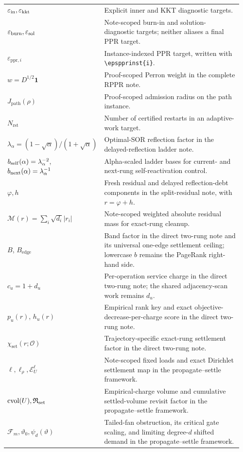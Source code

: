 \begin{longtable}{@{}>{\raggedright\arraybackslash}p{0.36\linewidth}>{\raggedright\arraybackslash}p{0.60\linewidth}@{}}
$\varepsilon_{\rm in},\varepsilon_{\rm kkt}$ & Explicit inner and KKT diagnostic targets. \\
$\varepsilon_{\rm burn},\varepsilon_{\rm sol}$ & Note-scoped burn-in and solution-diagnostic targets; neither aliases a final PPR target. \\
$\varepsilon_{\mathrm{ppr},i}$ & Instance-indexed PPR target, written with \texttt{\textbackslash epspprinst\{i\}}. \\
$w=D^{1/2}\mathbf1$ & Proof-scoped Perron weight in the complete RPPR note. \\
$J_{\mathrm{path}}(\rho)$ & Proof-scoped admission radius on the path instance. \\
$N_{\mathrm{rst}}$ & Number of certified restarts in an adaptive-work target. \\
$\lambda_\alpha=(1-\sqrt\alpha)/(1+\sqrt\alpha)$ & Optimal-SOR reflection factor in the delayed-reflection ladder note. \\
$b_{\rm self}(\alpha)=\lambda_\alpha^{-2}$, $b_{\rm next}(\alpha)=\lambda_\alpha^{-1}$ & Alpha-scaled ladder bases for current- and next-rung self-reactivation control. \\
$\varphi,h$ & Fresh residual and delayed reflection-debt components in the split-residual note, with $r=\varphi+h$. \\
$\mathcal M(r)=\sum_i\sqrt{d_i}|r_i|$ & Note-scoped weighted absolute residual mass for exact-rung cleanup. \\
$B$, $B_{\mathrm{edge}}$ & Band factor in the direct two-rung note and its universal one-edge settlement ceiling; lowercase $b$ remains the PageRank right-hand side. \\
$c_u=1+d_u$ & Per-operation service charge in the direct two-rung note; the shared adjacency-scan work remains $d_u$. \\
$p_u(r)$, $h_u(r)$ & Empirical rank key and exact objective-decrease-per-charge score in the direct two-rung note. \\
$\chi_{\mathrm{set}}(r;\mathcal O)$ & Trajectory-specific exact-rung settlement factor in the direct two-rung note. \\
$\ell,\ell_\rho,\mathcal E_U^\ell$ & Note-scoped fixed loads and exact Dirichlet settlement map in the propagate--settle framework. \\
$\operatorname{cvol}(U),\mathfrak R_{\rm set}$ & Empirical-charge volume and cumulative settled-volume revisit factor in the propagate--settle framework. \\
$\mathcal F_m,\vartheta_0,\psi_d(\vartheta)$ & Tailed-fan obstruction, its critical gate scaling, and limiting degree-$d$ shifted demand in the propagate--settle framework. \\

\end{longtable}
